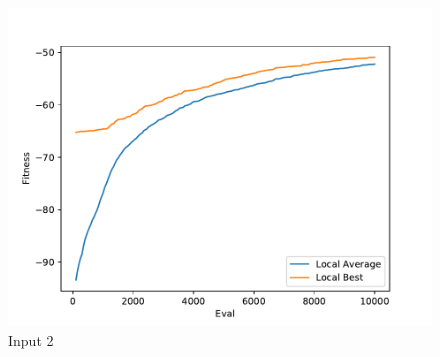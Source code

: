 \documentclass{standalone}
\begin{document}
\begin{figure}[!htb]
	\caption{Input 2}
	\label{fig:graph_2030}
	\includegraphics[width=\textwidth]{../graphs/graphs/2030.pdf}
\end{figure}
\end{document}
